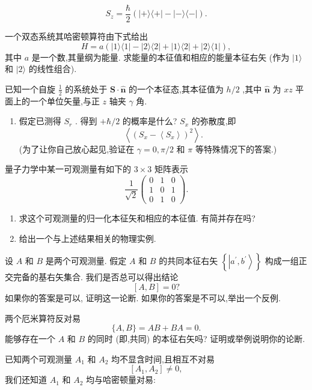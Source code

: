 \documentclass[lang=cn,newtx,10pt,scheme=chinese,thmcnt=section]{elegantbook}
\begin{document}
\begin{problemset}
$$	$$
	$$
	{S}_{z} = \frac{\hbar }{2}\left( {\left| {+\rangle \langle + }\right| - \left| {-\rangle \langle - }\right| }\right) .
	$$
	\item 一个双态系统其哈密顿算符由下式给出
	$$
	H = a\left( {\left| {1\rangle \langle 1}\right| - \left| {2\rangle \langle 2}\right| + \left| {1\rangle \langle 2}\right| + \left| {2\rangle \langle 1}\right| }\right) ,
	$$
	其中 $a$ 是一个数,其量纲为能量. 求能量的本征值和相应的能量本征右矢 (作为 $|1\rangle$ 和 $|2\rangle$ 的线性组合).
	\item 已知一个自旋 $\frac{1}{2}$ 的系统处于 $\mathbf{S} \cdot \widehat{\mathbf{n}}$ 的一个本征态,其本征值为 $h/2$ ,其中 $\widehat{\mathbf{n}}$ 为 ${xz}$ 平面上的一个单位矢量,与正 $z$ 轴夹 $\gamma$ 角.
	\begin{enumerate}
		\item 假定已测得 ${S}_{r}$ . 得到 $+ \hbar /2$ 的概率是什么?
		 ${S}_{x}$ 的弥散度,即
		$$
		\left\langle {\left( {S}_{x} - \left\langle {S}_{x}\right\rangle \right) }^{2}\right\rangle \text{.}
		$$
		(为了让你自己放心起见,验证在 $\gamma = 0,\pi /2$ 和 $\pi$ 等特殊情况下的答案.)
	\end{enumerate}
	\item 量子力学中某一可观测量有如下的 $3 \times 3$ 矩阵表示
	$$
	\frac{1}{\sqrt{2}}\left( \begin{array}{lll} 0 & 1 & 0 \\ 1 & 0 & 1 \\ 0 & 1 & 0 \end{array}\right) .
	$$
	\begin{enumerate}
		\item 求这个可观测量的归一化本征矢和相应的本征值. 有简并存在吗?
		\item 给出一个与上述结果相关的物理实例.
	\end{enumerate}
	\item 设 $A$ 和 $B$ 是两个可观测量. 假定 $A$ 和 $B$ 的共同本征右矢 $\left\{ \left| {{a}^{\prime },{b}^{\prime }}\right\rangle \right\}$ 构成一组正交完备的基右矢集合. 我们是否总可以得出结论
	$$
	\left\lbrack {A, B}\right\rbrack = 0?
	$$
	如果你的答案是可以, 证明这一论断. 如果你的答案是不可以,举出一个反例.
	\item 两个厄米算符反对易
	$$
	\{ A, B\} = {AB} + {BA} = 0.
	$$
	能够存在一个 $A$ 和 $B$ 的同时 (即,共同) 的本征右矢吗? 证明或举例说明你的论断.
	\item 已知两个可观测量 ${A}_{1}$ 和 ${A}_{2}$ 均不显含时间,且相互不对易
	$$
	\left\lbrack {{A}_{1},{A}_{2}}\right\rbrack \neq 0,
	$$
	我们还知道 ${A}_{1}$ 和 ${A}_{2}$ 均与哈密顿量对易:

\end{problemset}
\end{document}
